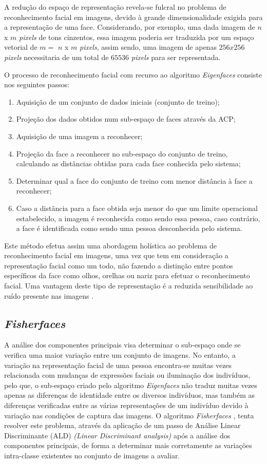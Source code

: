 A redução do espaço de representação revela-se fulcral no problema de reconhecimento facial em imagens, devido à grande dimensionalidade exigida para a representação de uma face. Considerando, por exemplo, uma dada imagem de $n$ x $m$ \textit{pixels} de tons cinzentos, essa imagem poderia ser traduzida por um espaço vetorial de $m = $ $n$ x $m$ \textit{pixels}, assim sendo, uma imagem de apenas $256x256$ \textit{pixels} necessitaria de um total de $65536$ \textit{pixels} para ser representada.

O processo de reconhecimento facial com recurso ao algoritmo \textit{Eigenfaces} consiste nos seguintes passos:
\begin{enumerate}
\item Aquisição de um conjunto de dados iniciais (conjunto de treino);
\item Projeção dos dados obtidos num sub-espaço de faces através da ACP;
\item Aquisição de uma imagem a reconhecer;
\item Projeção da face a reconhecer no sub-espaço do conjunto de treino, calculando as distâncias obtidas para cada face conhecida pelo sistema;
\item Determinar qual a face do conjunto de treino com menor distância à face a reconhecer;
\item Caso a distância para a face obtida seja menor do que um limite operacional estabelecido, a imagem é reconhecida como sendo essa pessoa, caso contrário, a face é identificada como sendo uma pessoa desconhecida pelo sistema.
\end{enumerate}

Este método efetua assim uma abordagem holística ao problema de reconhecimento facial em imagens, uma vez que tem em consideração a representação facial como um todo, não fazendo a distinção entre pontos específicos da face como olhos, orelhas ou nariz para efetuar o reconhecimento facial. Uma vantagem deste tipo de representação é a reduzida sensibilidade ao ruído presente nas imagens \cite{Zhao2003}.

\subsection{\textit{Fisherfaces}} \label{sec:fisher}
A análise dos componentes principais visa determinar o sub-espaço onde se verifica uma maior variação entre um conjunto de imagens. No entanto, a variação na representação facial de uma pessoa encontra-se muitas vezes relacionada com mudanças de expressões faciais ou iluminação dos indivíduos, pelo que, o sub-espaço criado pelo algoritmo \textit{Eigenfaces} não traduz muitas vezes apenas as diferenças de identidade entre os diversos indivíduos, mas também as diferenças verificadas entre as várias representações de um indivíduo devido à variação nas condições de captura das imagens. O algoritmo \textit{Fisherfaces} \cite{Belhumeur1997, Etemad1997, Zhao1998}, tenta resolver este problema, através da aplicação de um passo de Análise Linear Discriminante (ALD) \textit{(Linear Discriminant analysis)} após a análise dos componentes principais, de forma a determinar mais corretamente as variações intra-classe existentes no conjunto de imagens a avaliar.

